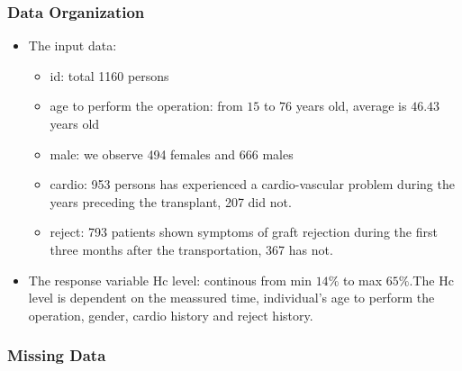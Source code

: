 \documentclass[
]{article}
\providecommand{\tightlist}{%
  \setlength{\itemsep}{0pt}\setlength{\parskip}{0pt}}
\begin{document}
\hypertarget{data-organization}{%
\subsubsection{Data Organization}\label{data-organization}}

\begin{itemize}
\tightlist
\item
  The input data:

  \begin{itemize}
  \tightlist
  \item
    id: total 1160 persons
  \item
    age to perform the operation: from \(15\) to \(76\) years old,
    average is \(46.43\) years old
  \item
    male: we observe 494 females and 666 males
  \item
    cardio: 953 persons has experienced a cardio-vascular problem during
    the years preceding the transplant, 207 did not.
  \item
    reject: 793 patients shown symptoms of graft rejection during the
    first three months after the transportation, 367 has not.
  \end{itemize}
\item
  The response variable Hc level: continous from min \(14\%\) to max
  \(65\%\).The Hc level is dependent on the meassured time, individual's
  age to perform the operation, gender, cardio history and reject
  history.
\end{itemize}

\hypertarget{missing-data}{%
\subsubsection{Missing Data}\label{missing-data}}
\end{document}
